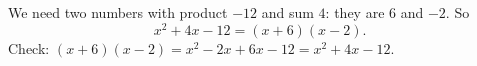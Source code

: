 We need two numbers with product $-12$ and sum $4$: they are $6$ and $-2$. So
\[x^2+4x-12=\boxed{(x+6)(x-2)}.\]
Check: $(x+6)(x-2)=x^2-2x+6x-12=x^2+4x-12$.
